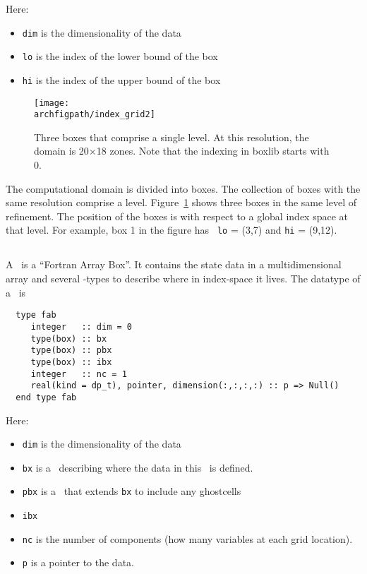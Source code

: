 \noindent Here:
\begin{itemize}
\item {\tt dim} is the dimensionality of the data
\item {\tt lo} is the index of the lower bound of the box
\item {\tt hi} is the index of the upper bound of the box
\end{itemize}


\begin{figure}[h]
\centering
\texttt{[image: \\archfigpath/index\_grid2]}
\caption{\label{fig:boxes} Three boxes that comprise a single level.
At this resolution, the domain is 20$\times$18 zones.  Note that the
indexing in boxlib starts with $0$.}
\end{figure}


The computational domain is divided into boxes.  The collection of
boxes with the same resolution comprise a level.
Figure~\ref{fig:boxes} shows three boxes in the same level of
refinement.  The position of the boxes is with respect to a global
index space at that level.  For example, box 1 in the figure has {\tt
  lo} = (3,7) and {\tt hi} = (9,12).


\subsection{\fab}

A \fab\ is a ``Fortran Array Box''.  It contains the state data in a
multidimensional array and several \boxtype-types to describe where in
index-space it lives.  The datatype of a \fab\ is
\begin{verbatim}
  type fab
     integer   :: dim = 0
     type(box) :: bx
     type(box) :: pbx
     type(box) :: ibx
     integer   :: nc = 1
     real(kind = dp_t), pointer, dimension(:,:,:,:) :: p => Null()
  end type fab
\end{verbatim}
 
\noindent Here:
\begin{itemize}
\item {\tt dim} is the dimensionality of the data
\item {\tt bx} is a \boxtype\ describing where the data in this
  \fab\ is defined.
\item {\tt pbx} is a \boxtype\ that extends {\tt bx} to include
  any ghostcells
\item {\tt ibx}
\item {\tt nc} is the number of components (how many variables at  
  each grid location).
\item {\tt p} is a pointer to the data.
\end{itemize}

